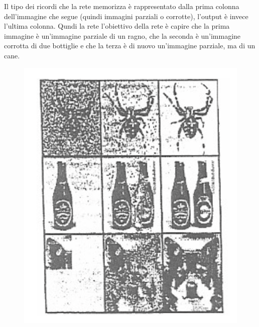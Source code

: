 Il tipo dei ricordi che la rete memorizza è rappresentato dalla prima colonna dell'immagine che segue (quindi immagini parziali o corrotte), l'output è invece l'ultima colonna. Qundi la rete l'obiettivo della rete è capire che la prima immagine è un'immagine parziale di un ragno, che la seconda è un'immagine corrotta di due bottiglie e che la terza è di nuovo un'immagine parziale, ma di un cane.
\begin{figure}[!h]
    \includegraphics[scale=.5]{images/hopfield_networks/attr_net.png}
    \centering
\end{figure}

